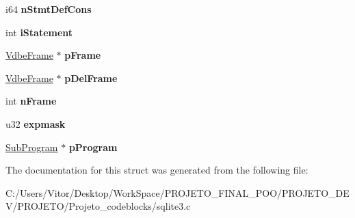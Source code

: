 \begin{DoxyCompactItemize}
\item 
\hypertarget{struct_vdbe_ab6a710cd4796c6adc8967e7b5bf35757}{i64 {\bfseries n\-Stmt\-Def\-Cons}}\label{struct_vdbe_ab6a710cd4796c6adc8967e7b5bf35757}

\item 
\hypertarget{struct_vdbe_ae2b5893f3d37e004acac58bffee1a229}{int {\bfseries i\-Statement}}\label{struct_vdbe_ae2b5893f3d37e004acac58bffee1a229}

\item 
\hypertarget{struct_vdbe_afd754aaedd6cd5b229fbeff33177fe04}{\hyperlink{struct_vdbe_frame}{Vdbe\-Frame} $\ast$ {\bfseries p\-Frame}}\label{struct_vdbe_afd754aaedd6cd5b229fbeff33177fe04}

\item 
\hypertarget{struct_vdbe_ab8f22136c8bdb4c02962a1ae081e9116}{\hyperlink{struct_vdbe_frame}{Vdbe\-Frame} $\ast$ {\bfseries p\-Del\-Frame}}\label{struct_vdbe_ab8f22136c8bdb4c02962a1ae081e9116}

\item 
\hypertarget{struct_vdbe_a27fbd083a0335ac2b332d37ea2b90bdc}{int {\bfseries n\-Frame}}\label{struct_vdbe_a27fbd083a0335ac2b332d37ea2b90bdc}

\item 
\hypertarget{struct_vdbe_a5e22eedb6ee963a0bcf27fc9fd8b8e43}{u32 {\bfseries expmask}}\label{struct_vdbe_a5e22eedb6ee963a0bcf27fc9fd8b8e43}

\item 
\hypertarget{struct_vdbe_a9239ea72573142101328be15c90de62b}{\hyperlink{struct_sub_program}{Sub\-Program} $\ast$ {\bfseries p\-Program}}\label{struct_vdbe_a9239ea72573142101328be15c90de62b}

\end{DoxyCompactItemize}


The documentation for this struct was generated from the following file\-:\begin{DoxyCompactItemize}
\item 
C\-:/\-Users/\-Vitor/\-Desktop/\-Work\-Space/\-P\-R\-O\-J\-E\-T\-O\-\_\-\-F\-I\-N\-A\-L\-\_\-\-P\-O\-O/\-P\-R\-O\-J\-E\-T\-O\-\_\-\-D\-E\-V/\-P\-R\-O\-J\-E\-T\-O/\-Projeto\-\_\-codeblocks/sqlite3.\-c\end{DoxyCompactItemize}

